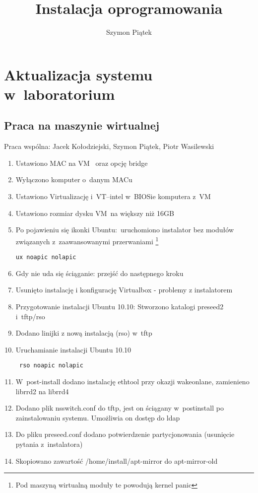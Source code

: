 


\title{Instalacja oprogramowania}
\author{Szymon Piątek}



\maketitle

\section{Aktualizacja systemu w~laboratorium}
\subsection{Praca na maszynie wirtualnej}
Praca wspólna: Jacek Kołodziejski, Szymon Piątek, Piotr Wasilewski

\begin{enumerate}
        
        \item Ustawiono MAC na VM~ oraz opcję bridge
        \item Wyłączono komputer o~danym MACu
        \item Ustawiono Virtualizację i~VT--intel w~BIOSie komputera z~VM
        \item Ustawiono rozmiar dysku VM~na większy niż 16GB
        \item Po pojawieniu się ikonki Ubuntu:~uruchomiono instalator bez modułów związanych z~zaawansowanymi przerwaniami
        \footnote{Pod maszyną wirtualną moduły te powodują kernel panic}
        \begin{verbatim}ux noapic nolapic\end{verbatim}
        \item Gdy nie uda się ściąganie: przejść do następnego kroku
        \item Usunięto instalację i konfigurację Virtualbox - problemy z instalatorem
        \item Przygotowanie instalacji Ubuntu 10.10: Stworzono katalogi preseed2 i~tftp/rso
        \item Dodano linijki z nową instalacją (rso) w~tftp
        \item Uruchamianie instalacji Ubuntu 10.10
        \begin{verbatim} rso noapic nolapic \end{verbatim}
        \item W~post-install dodano instalację ethtool przy okazji wakeonlane, zamienieno librrd2 na librrd4
        \item Dodano plik nsswitch.conf do tftp, jest on ściągany w~post\-install po zainstalowaniu systemu. Umożliwia on dostęp do ldap
        \item Do pliku preseed.conf dodano potwierdzenie partycjonowania (usunięcie pytania z~instalatora)
	\item Skopiowano zawartość /home/install/apt-mirror do apt-mirror-old	

\end{enumerate}





                       

